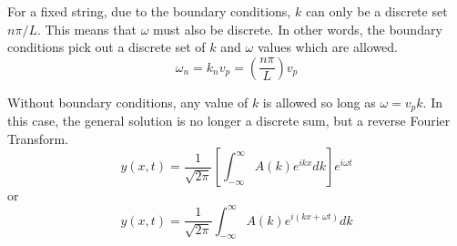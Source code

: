 \documentclass[11pt]{article}
\begin{document}
For a fixed string, due to the boundary conditions, $k$ can only be a discrete set $n\pi /L$. This means that $\omega$ must also be discrete. In other words, the boundary conditions pick out a discrete set of $k$ and $\omega$ values which are allowed.
\begin{equation}
	\omega_n = k_n v_p = \left( \frac{n\pi}{L} \right)v_p
\end{equation}

Without boundary conditions, any value of $k$ is allowed so long as $\omega = v_p k$. In this case, the general solution is no longer a discrete sum, but a reverse Fourier Transform.
\begin{equation}
	y(x, t) = \frac{1}{\sqrt{2\pi}} \left[ \int_{-\infty}^{\infty} A(k) e^{ikx} dk \right]e^{i\omega t}
\end{equation}
or
\begin{equation}
	y(x, t) = \frac{1}{\sqrt{2\pi}} \int_{-\infty}^\infty A(k)e^{i(kx + \omega t)}dk
\end{equation}

%		
%		


\end{document}
